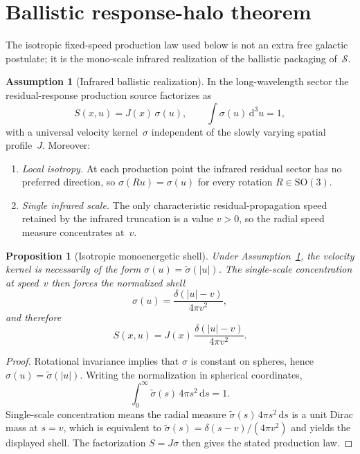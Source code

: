 \documentclass[11pt]{article}
\newtheorem{proposition}[theorem]{Proposition}
\theoremstyle{definition}
\newtheorem{assumption}[theorem]{Assumption}
\theoremstyle{remark}
\newcommand{\dd}{\mathrm{d}}
\begin{document}
\section{Ballistic response-halo theorem}
\label{sec:halo}
The isotropic fixed-speed production law used below is not an extra free galactic postulate; it is the mono-scale infrared realization of the ballistic packaging of~$\mathcal S$.

\begin{assumption}[Infrared ballistic realization]
\label{ass:ir-ballistic}
In the long-wavelength sector the residual-response production source factorizes as
\begin{equation}
  S(x,u)=J(x)\,\sigma(u),
  \qquad\int\sigma(u)\,\dd^{3}u=1,
\end{equation}
with a universal velocity kernel~$\sigma$ independent of the slowly varying spatial profile~$J$.
Moreover:
\begin{enumerate}
\item \emph{Local isotropy.} At each production point the infrared residual sector has no preferred direction, so $\sigma(Ru)=\sigma(u)$ for every rotation $R\in\mathrm{SO}(3)$.
\item \emph{Single infrared scale.} The only characteristic residual-propagation speed retained by the infrared truncation is a value $v>0$, so the radial speed measure concentrates at~$v$.
\end{enumerate}
\end{assumption}

\begin{proposition}[Isotropic monoenergetic shell]
\label{prop:ir-shell}
Under Assumption~\ref{ass:ir-ballistic}, the velocity kernel is necessarily of the form $\sigma(u)=\tilde\sigma(|u|)$.
The single-scale concentration at speed~$v$ then forces the normalized shell
\begin{equation}
  \sigma(u)=\frac{\delta(|u|-v)}{4\pi v^{2}},
\end{equation}
and therefore
\begin{equation}
  S(x,u)=J(x)\,\frac{\delta(|u|-v)}{4\pi v^{2}}.
\end{equation}
\end{proposition}

\begin{proof}
Rotational invariance implies that $\sigma$ is constant on spheres, hence $\sigma(u)=\tilde\sigma(|u|)$.
Writing the normalization in spherical coordinates,
\[
  \int_{0}^{\infty}\tilde\sigma(s)\,4\pi s^{2}\,\dd s=1.
\]
Single-scale concentration means the radial measure $\tilde\sigma(s)\,4\pi s^{2}\,\dd s$ is a unit Dirac mass at $s=v$, which is equivalent to $\tilde\sigma(s)=\delta(s-v)/(4\pi v^{2})$ and yields the displayed shell.
The factorization $S=J\sigma$ then gives the stated production law.
\end{proof}
\end{document}
